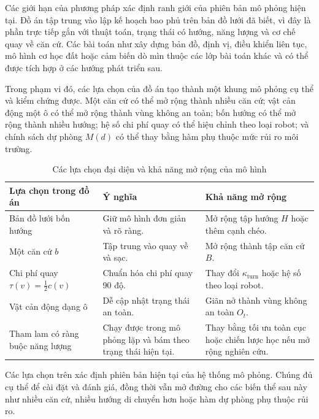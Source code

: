 \documentclass[../DoAn.tex]{subfiles}
\begin{document}
Các giới hạn của phương pháp xác định ranh giới của phiên bản mô phỏng hiện tại. Đồ án tập trung vào lập kế hoạch bao phủ trên bản đồ lưới đã biết, vì đây là phần trực tiếp gắn với thuật toán, trạng thái có hướng, năng lượng và cơ chế quay về căn cứ. Các bài toán như xây dựng bản đồ, định vị, điều khiển liên tục, mô hình cơ học đất hoặc cảm biến dò mìn thuộc các lớp bài toán khác và có thể được tích hợp ở các hướng phát triển sau.

Trong phạm vi đó, các lựa chọn của đồ án tạo thành một khung mô phỏng cụ thể và kiểm chứng được. Một căn cứ có thể mở rộng thành nhiều căn cứ; vật cản động một ô có thể mở rộng thành vùng không an toàn; bốn hướng có thể mở rộng thành nhiều hướng; hệ số chi phí quay có thể hiệu chỉnh theo loại robot; và chính sách dự phòng $M(d)$ có thể thay bằng hàm phụ thuộc mức rủi ro môi trường.

\begin{table}[!htbp]
\centering
\caption{Các lựa chọn đại diện và khả năng mở rộng của mô hình}
\small
\setlength{\tabcolsep}{4pt}
\renewcommand{\arraystretch}{1.05}
\begin{tabular}{|L{0.30\textwidth}|L{0.30\textwidth}|L{0.30\textwidth}|}
\hline
\textbf{Lựa chọn trong đồ án} & \textbf{Ý nghĩa} & \textbf{Khả năng mở rộng} \\
\hline
Bản đồ lưới bốn hướng & Giữ mô hình đơn giản và rõ ràng. & Mở rộng tập hướng $H$ hoặc thêm cạnh chéo. \\
\hline
Một căn cứ $b$ & Tập trung vào quay về và sạc. & Mở rộng thành tập căn cứ $B$. \\
\hline
Chi phí quay $\tau(v)=\frac{1}{2}c(v)$ & Chuẩn hóa chi phí quay 90 độ. & Thay đổi $\kappa_{\text{turn}}$ hoặc hệ số theo loại robot. \\
\hline
Vật cản động dạng ô & Dễ cập nhật trạng thái an toàn. & Giãn nở thành vùng không an toàn $O_t$. \\
\hline
Tham lam có ràng buộc năng lượng & Chạy được trong mô phỏng lặp và bám theo trạng thái hiện tại. & Thay bằng tối ưu toàn cục hoặc chiến lược học nếu mở rộng nghiên cứu. \\
\hline
\end{tabular}\end{table}

Các lựa chọn trên xác định phiên bản hiện tại của hệ thống mô phỏng. Chúng đủ cụ thể để cài đặt và đánh giá, đồng thời vẫn mở đường cho các biến thể sau này như nhiều căn cứ, nhiều hướng di chuyển hơn hoặc hàm dự phòng phụ thuộc rủi ro.
\end{document}
